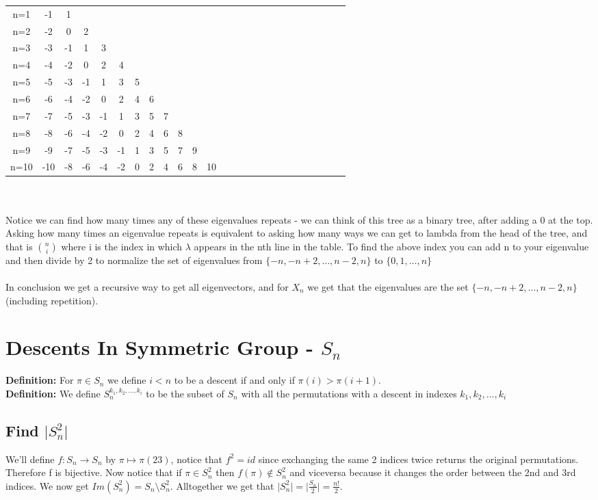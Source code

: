 \documentclass{article}
\begin{document}
\begin{tabular}{c|c|c|c|c|c|c|c|c|c|c|c|c|c|c|c|c||c|c|c|c|c|c|c|c}
n=1 & -1 & 1 \\
n=2 & -2 & 0 & 2 \\
n=3 & -3 & -1 & 1 & 3 \\
n=4 & -4 & -2 & 0 & 2 & 4\\
n=5 & -5 & -3 & -1 & 1 & 3 & 5\\
n=6 & -6 & -4 & -2 & 0 & 2 & 4 & 6 \\
n=7 & -7 & -5 & -3 & -1 & 1 & 3 & 5 & 7 \\
n=8 & -8 & -6 & -4 & -2 & 0 & 2 & 4 & 6 & 8 \\
n=9 & -9 & -7 & -5 & -3 & -1 & 1 & 3 & 5 & 7 & 9 \\
n=10 & -10 & -8 & -6 & -4 & -2 & 0 & 2 & 4 & 6 & 8 & 10 \\
\end{tabular}
\\
\\
Notice we can find how many times any of these eigenvalues repeats - we can think of this tree as a binary tree, after adding a 0 at the top. Asking how many times an eigenvalue repeats is equivalent to asking how many ways we can get to lambda from the head of the tree, and that is ${n\choose i}$ where i is the index in which $\lambda$ appears in the nth line in the table. To find the above index you can add n to your eigenvalue and then divide by 2 to normalize the set of eigenvalues from $\{-n,-n+2,\dots,n-2,n\}$ to $\{0,1,\dots,n\}$
\\
\\
In conclusion we get a recursive way to get all eigenvectors, and for $X_n$ we get that the eigenvalues are the set $\{-n,-n+2,...,n-2,n\}$ (including repetition).

\section{Descents In Symmetric Group - $S_n$} 
\textbf{Definition:}
For $\pi\in S_n$ we define $i<n$ to be a descent if and only if $\pi(i)>\pi(i+1)$.\\
\textbf{Definition:}
We define $S^{k_1, k_2,  \dots, k_i}_n$ to be the subset of $S_n$ with all the permutations with a descent in indexes ${k_1, k_2, \dots, k_i}$
\subsection{Find $\vert S^2_n\vert$}
We'll define $f: S_n \to S_n$ by $\pi \mapsto \pi (23)$, notice that $f^2 = id$ since exchanging the same 2 indices twice returns the original permutations. Therefore f is bijective. Now notice that if $\pi \in S^2_n$ then $f(\pi) \notin S^2_n$ and viceversa because it changes the order between the 2nd and 3rd indices. We now get $Im(S^2_n) =  S_n \setminus S^2_n$. Alltogether we get that $\vert S^2_n \vert = \vert\frac{S_n}{2} \vert = \frac{n!}{2}$. 
\end{document}
